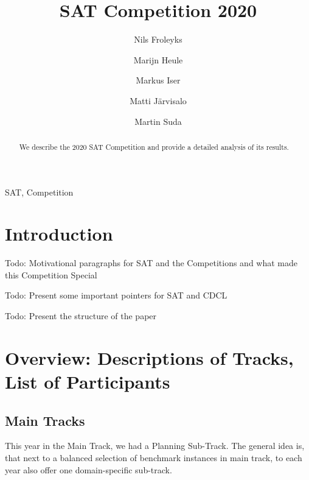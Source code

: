 \documentclass{elsarticle}
\title{SAT Competition 2020\tnoteref{title}}
\author[jku]{Nils Froleyks}
\author[cmu]{Marijn Heule}
\author[kit]{Markus Iser}
\author[hiit]{Matti Järvisalo}
\author[ctu]{Martin Suda}
\newcommand{\todo}[1]{{\color{purple}Todo: #1}}
\begin{document}
\begin{abstract}
We describe the 2020 SAT Competition and provide a detailed analysis of its results.
\end{abstract}

\begin{keyword}
SAT, Competition
\end{keyword}

\maketitle

\section{Introduction}

\todo{Motivational paragraphs for SAT and the Competitions and what made this Competition Special}

\todo{Present some important pointers for SAT and CDCL}

\todo{Present the structure of the paper}


\section{Overview: Descriptions of Tracks, List of Participants}

\subsection{Main Tracks}

This year in the Main Track, we had a Planning Sub-Track. 
The general idea is, that next to a balanced selection of benchmark instances in main track, to each year also offer one domain-specific sub-track. 



\makeatletter
\newcommand{\stack}[1]{%
    \begin{tabular}{@{}l@{}}#1\checknextarg}
\newcommand{\checknextarg}{\@ifnextchar\bgroup{\gobblenextarg}{ \end{tabular}}}
\newcommand{\gobblenextarg}[1]{\\#1\@ifnextchar\bgroup{\gobblenextarg}{ \end{tabular}}}
\makeatother
\end{document}
